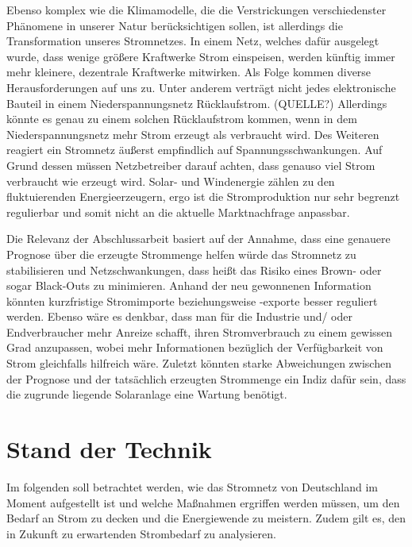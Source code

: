 \documentclass[12pt, a4paper]{article}
\begin{document}
Ebenso komplex wie die Klimamodelle, die die Verstrickungen verschiedenster Phänomene in unserer Natur berücksichtigen sollen, ist allerdings die Transformation unseres Stromnetzes. In einem Netz, welches dafür ausgelegt wurde, dass wenige größere Kraftwerke Strom einspeisen, werden künftig immer mehr kleinere, dezentrale Kraftwerke mitwirken. Als Folge kommen diverse Herausforderungen auf uns zu. Unter anderem verträgt nicht jedes elektronische Bauteil in einem Niederspannungsnetz Rücklaufstrom. (QUELLE?) Allerdings könnte es genau zu einem solchen Rücklaufstrom kommen, wenn in dem Niederspannungsnetz mehr Strom erzeugt als verbraucht wird. Des Weiteren reagiert ein Stromnetz äußerst empfindlich auf Spannungsschwankungen. Auf Grund dessen müssen Netzbetreiber darauf achten, dass genauso viel Strom verbraucht wie erzeugt wird. Solar- und Windenergie zählen zu den fluktuierenden Energieerzeugern, ergo ist die Stromproduktion nur sehr begrenzt regulierbar und somit nicht an die aktuelle Marktnachfrage anpassbar.

Die Relevanz der Abschlussarbeit basiert auf der Annahme, dass eine genauere Prognose über die erzeugte Strommenge helfen würde das Stromnetz zu stabilisieren und Netzschwankungen, dass heißt das Risiko eines Brown- oder sogar Black-Outs zu minimieren. Anhand der neu gewonnenen Information könnten kurzfristige Stromimporte beziehungsweise -exporte besser reguliert werden. Ebenso wäre es denkbar, dass man für die Industrie und/ oder Endverbraucher mehr Anreize schafft, ihren Stromverbrauch zu einem gewissen Grad anzupassen, wobei mehr Informationen bezüglich der Verfügbarkeit von Strom gleichfalls hilfreich wäre. Zuletzt könnten starke Abweichungen zwischen der Prognose und der tatsächlich erzeugten Strommenge ein Indiz dafür sein, dass die zugrunde liegende Solaranlage eine Wartung benötigt.


\newpage

\section{Stand der Technik}

Im folgenden soll betrachtet werden, wie das Stromnetz von Deutschland im Moment aufgestellt ist und welche Maßnahmen ergriffen werden müssen, um den Bedarf an Strom zu decken und die Energiewende zu meistern. Zudem gilt es, den in Zukunft zu erwartenden Strombedarf zu analysieren.
\end{document}
